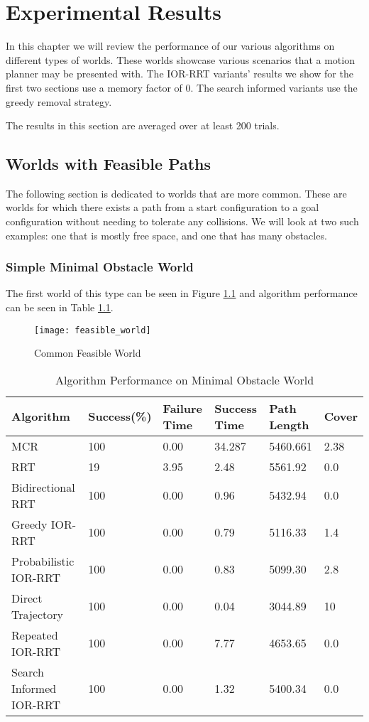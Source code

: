 \chapter{Experimental Results}
In this chapter we will review the performance of our various algorithms on different types of worlds. These worlds showcase various scenarios that a motion planner may be presented with. The IOR-RRT variants' results we show for the first two sections use a memory factor of 0. The search informed variants use the greedy removal strategy. 

The results in this section are averaged over at least 200 trials.
\section{Worlds with Feasible Paths}
The following section is dedicated to worlds that are more common. These are worlds for which there exists a path from a start configuration to a goal configuration without needing to tolerate any collisions. We will look at two such examples: one that is mostly free space, and one that has many obstacles.

\subsection{Simple Minimal Obstacle World}
The first world of this type can be seen in Figure \ref{fig:feasible_world} and algorithm performance can be seen in Table \ref{tab:feasible_world}. 

\begin{figure}[h!]
    \centering
    \texttt{[image: feasible\_world]}
    \caption{Common Feasible World}
    \label{fig:feasible_world}
\end{figure}

\begin{table}[h!]
\begin{tabular}{@{}llllll@{}}
\toprule
Algorithm & Success(\%)  & Failure Time  & Success Time  & Path Length & Cover\\ 
\midrule
MCR & 100 & 0.00 & 34.287 & 5460.661 & 2.38 \\
RRT & 19 & 3.95 & 2.48 & 5561.92 & 0.0 \\ 
Bidirectional RRT & 100 & 0.00 & 0.96 & 5432.94 & 0.0 \\
Greedy IOR-RRT & 100 & 0.00 & 0.79 & 5116.33 & 1.4 \\
Probabilistic IOR-RRT & 100 & 0.00 & 0.83 & 5099.30 & 2.8 \\
Direct Trajectory & 100 & 0.00 & 0.04 & 3044.89 & 10 \\
Repeated IOR-RRT & 100 & 0.00 & 7.77 & 4653.65 & 0.0 \\
Search Informed IOR-RRT & 100 & 0.00 & 1.32 & 5400.34 & 0.0 \\
\bottomrule
\end{tabular}
\caption{Algorithm Performance on Minimal Obstacle World}
\label{tab:feasible_world}
\end{table}

